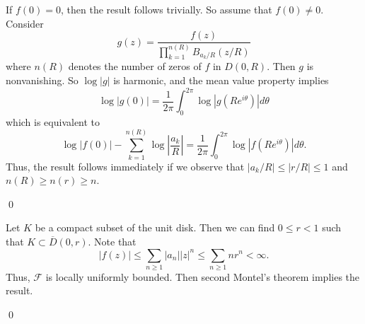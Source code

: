 \begin{problem}
	
	If $f(0) = 0$, then the result follows trivially.
	So assume that $f(0) \ne 0$.
	Consider
	\[
		g(z) = \frac{f(z)}{\prod_{k=1}^{n(R)}B_{a_k/R}(z/R)}
	\]
	where $n(R)$ denotes the number of zeros of $f$ in $D(0, R)$.
	Then $g$ is nonvanishing.
	So $\log |g|$ is harmonic, and the mean value property implies
	\[
		\log|g(0)| = \frac{1}{2\pi}\int_0^{2\pi}\log|g(Re^{i\theta})| d\theta
	\]
	which is equivalent to
	\[
		\log|f(0)| - \sum_{k=1}^{n(R)}\log \left \lvert \frac{a_k}{R} \right \lvert = \frac{1}{2\pi} \int_{0}^{2\pi} \log |f(Re^{i\theta})| d\theta.
	\]
	Thus, the result follows immediately if we observe that $|a_k / R| \leq |r/ R| \leq 1$ and $n(R) \geq n(r) \geq n$.

	\qed
\end{problem}

\begin{problem}
	
	Let $K$ be a compact subset of the unit disk.
	Then we can find $0\leq r < 1$ such that $K \subset \overline{D}(0, r)$.
	Note that
	\[
		|f(z)| \leq \sum_{n\geq 1}|a_n||z|^n \leq \sum_{n\geq 1 }nr^n < \infty.
	\]
	Thus, $\mathcal{F}$ is locally uniformly bounded.
	Then second Montel's theorem implies the result.

	\qed
\end{problem}
